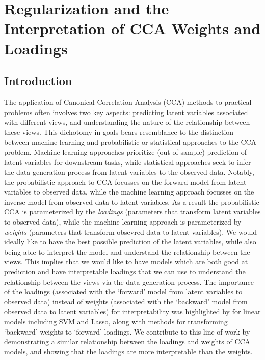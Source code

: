 \chapter{Regularization and the Interpretation of CCA Weights and Loadings}\label{chap:als}
\minitoc


\section{Introduction}\label{sec:introduction}

The application of Canonical Correlation Analysis (CCA) methods to practical problems often involves two key aspects: predicting latent variables associated with different views, and understanding the nature of the relationship between these views.
This dichotomy in goals bears resemblance to the distinction between machine learning and probabilistic or statistical approaches to the CCA problem.
Machine learning approaches prioritize (out-of-sample) prediction of latent variables for downstream tasks, while statistical approaches seek to infer the data generation process from latent variables to the observed data.
Notably, the probabilistic approach to CCA focusses on the forward model from latent variables to observed data, while the machine learning approach focusses on the inverse model from observed data to latent variables.
As a result the probabilistic CCA is parameterized by the \textit{loadings} (parameters that transform latent variables to observed data), while the machine learning approach is parameterized by \textit{weights} (parameters that transform obsevred data to latent variables).
We would ideally like to have the best possible prediction of the latent variables, while also being able to interpret the model and understand the relationship between the views.
This implies that we would like to have models which are both good at prediction and have interpretable loadings that we can use to understand the relationship between the views via the data generation process.
The importance of the loadings (associated with the `forward' model from latent variables to observed data) instead of weights (associated with the `backward' model from observed data to latent variables) for interpretability was highlighted by \cite{haufe2014interpretation} for linear models including SVM and Lasso, along with methods for transforming `backward' weights to `forward' loadings.
We contribute to this line of work by demonstrating a similar relationship between the loadings and weights of CCA models, and showing that the loadings are more interpretable than the weights.

